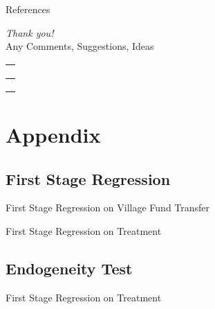 \documentclass[
11pt,notheorems,compress,hyperref={pdfauthor=Maghfira Ramadhani}
]{beamer}
\begin{document}
\section{}
\begin{frame}[allowframebreaks]{References}
    
    
\end{frame}

\begin{frame}{}
  \centering
  {\LARGE\emph{Thank you!}}\\
  \vspace{1cm}
  Any Comments, Suggestions, Ideas\\
  \href{mailto:\maghfira.ramadhani@gatech.edu}{\faEnvelope\ \  }\\
  \href{http://maghfiraer.github.io}{\faHome\ \  } \\
  \href{https://github.com/maghfiraer/ECON7023-Metrics-II/tree/main/Final_Project}{\faGithubSquare\ \  }
\end{frame}

\appendix
\section{Appendix}
\subsection{First Stage Regression}
\begin{frame}
\label{FSVF}
    \begin{table}[h]
    \caption{First Stage Regression on Village Fund Transfer \hyperlink{VFclick}{}}
    \scalebox{0.6}{}    
    \end{table}
\end{frame}

\begin{frame}
\label{FSD}
    \begin{table}[h]
    \caption{First Stage Regression on Treatment \hyperlink{Dclick}{}}
    \scalebox{0.55}{}    
    \end{table}
    
\end{frame}

\subsection{Endogeneity Test}
\begin{frame}
\label{Endotest}
    \begin{table}[h]
    \caption{First Stage Regression on Treatment \hyperlink{Dclick}{}}
    \scalebox{0.55}{}    
    \end{table}
    
\end{frame}
\end{document}
